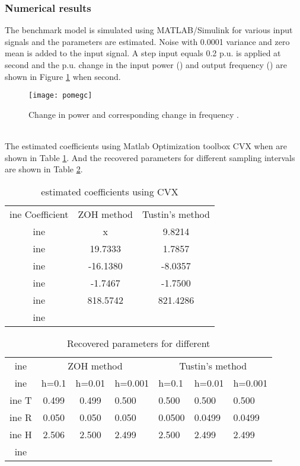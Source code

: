 \documentclass[10pt,journal,final]{IEEEtran}
\begin{document}
\subsubsection{Numerical results}
The benchmark model is simulated using MATLAB/Simulink for various input signals and the parameters are estimated. Noise with 0.0001 variance and zero mean is added to the input signal. A step input equals 0.2 p.u. is applied at  second and the p.u. change in the input power () and output {frequency} () are shown in Figure \ref{inout} when  second.
\begin{figure}[h!]
\centering
\texttt{[image: pomegc]}
\caption{Change in power  and corresponding change in frequency .}
\label{inout}
\end{figure}\\
The estimated coefficients using Matlab Optimization toolbox CVX \cite{cvx} when  are shown in Table \ref{tab:coeffi1}. And the recovered parameters for different sampling intervals are shown in Table \ref{tab:rec1}.
\begin{table}[h]
\caption {estimated coefficients using CVX} \label{tab:coeffi1}
\centering
\begin{tabular}{|c|c|c|}
ine
Coefficient & ZOH method         & Tustin's method    \\ ine
          & x                  & 9.8214  \\ ine
          & 19.7333  & 1.7857  \\ ine
         & -16.1380 & -8.0357  \\ ine
         & -1.7467 & -1.7500 \\ ine
          & 818.5742  & 821.4286  \\ ine
\end{tabular}
\end{table}
\begin{table}[h]
\caption {Recovered parameters for different } \label{tab:rec1}
\centering
\begin{tabular}{|c|c|c|l|l|l|l|}
ine
  & \multicolumn{3}{c|}{ZOH method} & \multicolumn{3}{c|}{Tustin's method} \\ ine
  & h=0.1    & h=0.01   & h=0.001   & h=0.1      & h=0.01     & h=0.001    \\ ine
T & 0.499    & 0.499    & 0.500     & 0.500      & 0.500      & 0.500      \\ ine
R & 0.050    & 0.050    & 0.050     & {0.0500}      & {0.0499}      & {0.0499}      \\ ine
H & 2.506    & 2.500    & 2.499     & {2.500}     & {2.499}     & {2.499}     \\ ine
\end{tabular}
\end{table}
\end{document}
